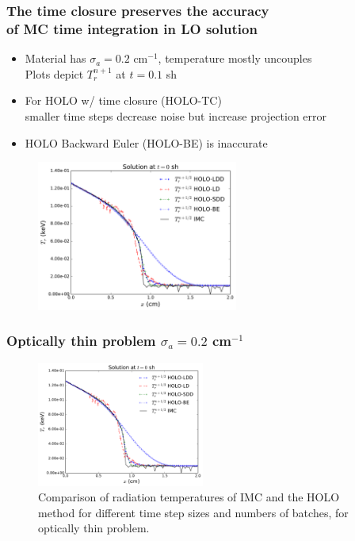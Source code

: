 \documentclass[xcolor=dvipsnames,hyperref={pdfpagelabels=false},unknownkeysallowed]{beamer}
\newcommand{\colG}[1]{{\color{Gray!110} #1}}
\newlength{\wideitemsep}
\let\olditem\item
\renewcommand{\item}{\setlength{\itemsep}{\wideitemsep}\olditem}
\begin{document}
\begin{frame}
    \frametitle{The time closure preserves the accuracy \\ of MC time
    integration in LO solution} %
    \fontsize{10.0pt}{10.0pt}\selectfont
    \vspace{0.1in}
    \begin{itemize}
        \item Material has $\sigma_a = 0.2$ cm$^{-1}$, temperature mostly uncouples  \\
            \colG{Plots depict $T_{r}^{n+1}$ at $t=0.1$ sh}
        \item For HOLO w/ time closure (HOLO-TC) \\ smaller time steps decrease noise but increase projection error
        \item HOLO Backward Euler (HOLO-BE) is inaccurate
    \end{itemize}
\begin{figure}[H]
  \centering
    \includegraphics[width=0.590\textwidth]{thin_temp_compare.pdf}
\end{figure}
\end{frame}

\begin{frame}
    \frametitle{Optically thin problem $\sigma_a=0.2$ cm$^{-1}$}
\begin{figure}[h!]
  \centering
    \includegraphics[width=0.49\textwidth]{thin_temp_compare.pdf}
    \caption{\label{fig:thin_temp_compare} Comparison of radiation temperatures of IMC and
    the HOLO method for different time step sizes and numbers of batches, for optically
thin problem. }
\end{figure}
\end{frame}
\end{document}
